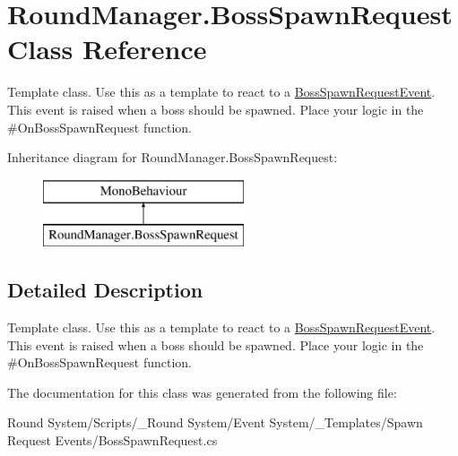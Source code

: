 \hypertarget{class_round_manager_1_1_boss_spawn_request}{}\section{Round\+Manager.\+Boss\+Spawn\+Request Class Reference}
\label{class_round_manager_1_1_boss_spawn_request}


Template class. Use this as a template to react to a \hyperlink{class_round_manager_1_1_events_1_1_boss_spawn_request_event}{Boss\+Spawn\+Request\+Event}. This event is raised when a boss should be spawned. Place your logic in the \#\+On\+Boss\+Spawn\+Request function.  


Inheritance diagram for Round\+Manager.\+Boss\+Spawn\+Request\+:\begin{figure}[H]
\begin{center}
\leavevmode
\includegraphics[height=2.000000cm]{class_round_manager_1_1_boss_spawn_request}
\end{center}
\end{figure}


\subsection{Detailed Description}
Template class. Use this as a template to react to a \hyperlink{class_round_manager_1_1_events_1_1_boss_spawn_request_event}{Boss\+Spawn\+Request\+Event}. This event is raised when a boss should be spawned. Place your logic in the \#\+On\+Boss\+Spawn\+Request function. 



The documentation for this class was generated from the following file\+:\begin{DoxyCompactItemize}
\item 
Round System/\+Scripts/\+\_\+\+Round System/\+Event System/\+\_\+\+Templates/\+Spawn Request Events/Boss\+Spawn\+Request.\+cs\end{DoxyCompactItemize}
